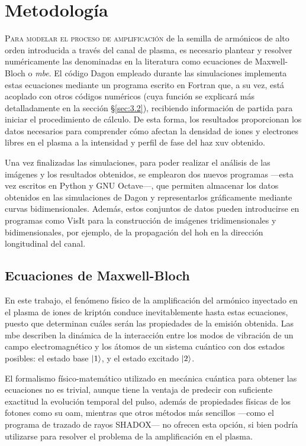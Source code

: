 \chapter{Metodología}\label{cap:3}
\lettrine{P}{ara modelar el proceso de amplificación} de la semilla de armónicos de alto orden introducida a través del canal de plasma, es necesario plantear y resolver numéricamente las denominadas en la literatura como ecuaciones de Maxwell-Bloch o \emph{\acrfull{mbe}}. El código Dagon empleado durante las simulaciones implementa estas ecuaciones mediante un programa escrito en Fortran que, a su vez, está acoplado con otros códigos numéricos (cuya función se explicará más detalladamente en la sección \S\ref{sec:3.2}), recibiendo información de partida para iniciar el procedimiento de cálculo. De esta forma, los resultados proporcionan los datos necesarios para comprender cómo afectan la densidad de iones y electrones libres en el plasma a la intensidad y perfil de fase del haz \acrshort{xuv} obtenido. 

Una vez finalizadas las simulaciones, para poder realizar el análisis de las imágenes y los resultados obtenidos, se emplearon dos nuevos programas ---esta vez escritos en Python y GNU Octave---, que permiten almacenar los datos obtenidos en las simulaciones de Dagon y representarlos gráficamente mediante curvas bidimensionales. Además, estos conjuntos de datos pueden introducirse en programas como VisIt para la construcción de imágenes tridimensionales y bidimensionales, por ejemplo, de la propagación del \acrshort{hoh} en la dirección longitudinal del canal.

\section{Ecuaciones de Maxwell-Bloch}\label{sec:3.1}
En este trabajo, el fenómeno físico de la amplificación del armónico inyectado en el plasma de iones de kriptón conduce inevitablemente hasta estas ecuaciones, puesto que determinan cuáles serán las propiedades de la emisión obtenida. Las \acrshort{mbe} describen la dinámica de la interacción entre los modos de vibración de un campo electromagnético y los átomos de un sistema cuántico con dos estados posibles: el estado base $|1\rangle$, y el estado excitado $|2\rangle$. 

El formalismo físico-matemático utilizado en mecánica cuántica para obtener las ecuaciones no es trivial\autocite{Cohen-Tannoudji2019a,Sakurai2020,Milonni1988}, aunque tiene la ventaja de predecir con suficiente exactitud la evolución temporal del pulso, además de propiedades físicas de los fotones como su \acrshort{oam}, mientras que otros métodos más sencillos ---como el programa de trazado de rayos SHADOX--- no ofrecen esta opción, si bien podría utilizarse para resolver el problema de la amplificación en el plasma. 


